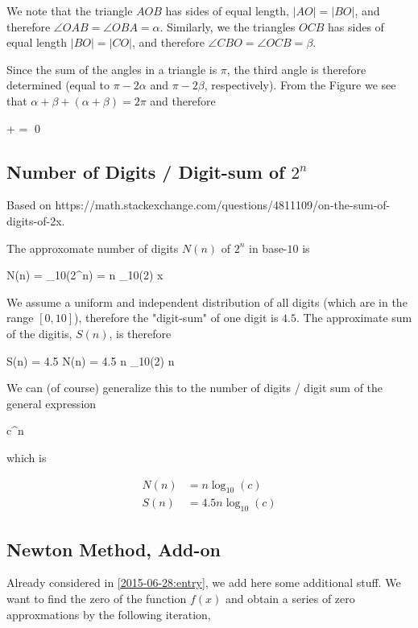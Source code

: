 We note that the triangle $AOB$ has sides of equal length, $|AO| = |BO|$, and therefore $\angle OAB = \angle OBA = \alpha$. Similarly, we the triangles $OCB$ has sides of equal length $|BO| = |CO|$, and therefore $\angle CBO = \angle OCB = \beta$.

Since the sum of the angles in a triangle is $\pi$, the third angle is therefore determined (equal to $\pi - 2\alpha$ and $\pi - 2 \beta$, respectively). From the Figure we see that $\alpha + \beta + (\alpha + \beta) = 2 \pi$ and therefore

\bee
\alpha + \beta = \pi \qed
\eee


\subsection{Number of Digits / Digit-sum of $2^n$}

Based on https://math.stackexchange.com/questions/4811109/on-the-sum-of-digits-of-2x.

The approxomate number of digits $N(n)$ of $2^n$ in base-$10$ is

\bee
N(n) = \log_{10}(2^n) = n \log_{10}(2)  x
\eee

We assume a uniform and independent distribution of all digits (which are in the range $[0,10]$), therefore the "digit-sum" of one digit is $4.5$. The approximate sum of the digitis, $S(n)$, is therefore

\bee
S(n) = 4.5 N(n) = 4.5 n \log_{10}(2)  n
\eee

We can (of course) generalize this to the number of digits / digit sum of the general expression

\bee
c^n
\eee

which is

\begin{align*}
N(n) &= n \log_{10}(c) \\
S(n) &= 4.5 n \log_{10}(c)
\end{align*}



\subsection{Newton Method, Add-on}

Already considered in \ref{2015-06-28:entry}, we add here some additional stuff. We want to find the zero of the function $f(x)$ and obtain a series of zero approxmations by the following iteration,

